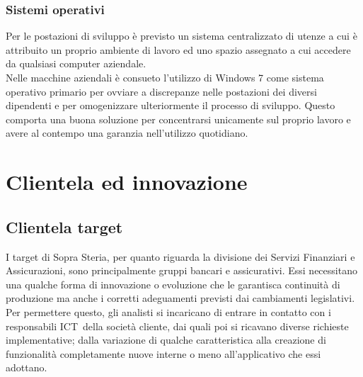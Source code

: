
	
	\subsubsection{Sistemi operativi}
	Per le postazioni di sviluppo è previsto un sistema centralizzato di utenze a cui è attribuito un proprio ambiente di lavoro ed uno spazio assegnato a cui accedere da qualsiasi computer aziendale.\\
	
	Nelle macchine aziendali è consueto l'utilizzo di Windows 7 come sistema operativo primario per ovviare a discrepanze nelle postazioni dei diversi dipendenti e per omogenizzare ulteriormente il processo di sviluppo. Questo comporta una buona soluzione per concentrarsi unicamente sul proprio lavoro e avere al contempo una garanzia nell'utilizzo quotidiano.
	
\section{Clientela ed innovazione}

	\subsection{Clientela target}
	
	I target di Sopra Steria, per quanto riguarda la divisione dei Servizi Finanziari e Assicurazioni, sono principalmente gruppi bancari e assicurativi. Essi necessitano una qualche forma di innovazione o evoluzione che le garantisca continuità di produzione ma anche i corretti adeguamenti previsti dai cambiamenti legislativi.\\
	
	 Per permettere questo, gli analisti si incaricano di entrare in contatto con i responsabili ICT\glossario\ della società cliente, dai quali poi si ricavano diverse richieste implementative; dalla variazione di	qualche caratteristica alla creazione di funzionalità completamente nuove interne o meno all'applicativo che essi adottano. 

